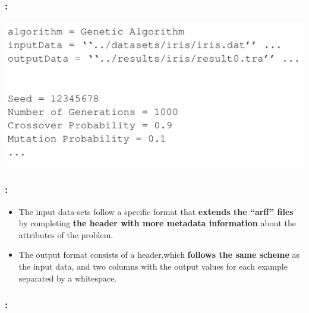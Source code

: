 \documentclass{beamer}
\begin{document}
\begin{CJK*}{UTF8}{bsmi}
\begin{frame}
\end{frame}


\begin{frame}
	\frametitle{\insertsection : \insertsubsection}
	
\begin{center}
\includegraphics[width=1\linewidth]{./4.png}
\end{center}
\end{frame}


\begin{frame}
	\frametitle{\insertsection : \insertsubsection}
	
	
	\begin{itemize}
		\item The input data-sets follow a specific format that \textbf{extends the “arff” files} by completing \textbf{the header with more metadata information} about the attributes of the problem.
		\item The output format consists of a header,which\textbf{ follows the same scheme }as the input data, and two columns with the output values for each example separated by a whitespace.
	\end{itemize}

	
\end{frame}


\begin{frame}
	\frametitle{\insertsection : \insertsubsection}
	

\end{frame}
\end{CJK*}
\end{document}
